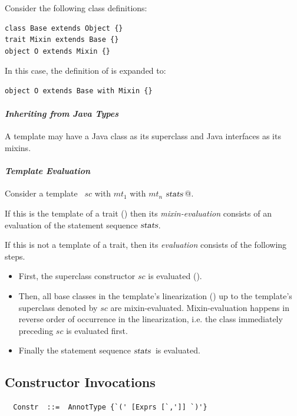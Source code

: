 \example Consider the following class definitions:

\begin{lstlisting}
class Base extends Object {}
trait Mixin extends Base {}
object O extends Mixin {}
\end{lstlisting}
In this case, the definition of  is expanded to:
\begin{lstlisting}
object O extends Base with Mixin {}
\end{lstlisting}



\paragraph{\em Inheriting from Java Types} A template may have a Java class as
its superclass and Java interfaces as its mixins. 

\paragraph{\em Template Evaluation}
Consider a template ~\lstinline@$sc$ with $mt_1$ with $mt_n$ {$\mbox{\sl stats}\,$}@.

If this is the template of a trait () then its {\em
mixin-evaluation} consists of an evaluation of the statement sequence
$\mbox{\sl stats}$.

If this is not a template of a trait, then its {\em evaluation}
consists of the following steps.
\begin{itemize}
\item
First, the superclass constructor $sc$ is evaluated ().
\item
Then, all base classes in the template's linearization
() up to the
template's superclass denoted by $sc$ are
mixin-evaluated. Mixin-evaluation happens in reverse order of
occurrence in the linearization, i.e. the class immediately preceding
$sc$ is evaluated first.
\item 
Finally the statement sequence $\mbox{\sl stats}\,$ is evaluated.
\end{itemize}

\subsection{Constructor Invocations}
\label{sec:constr-invoke}
\syntax\begin{lstlisting}
  Constr  ::=  AnnotType {`(' [Exprs [`,']] `)'}
\end{lstlisting}

